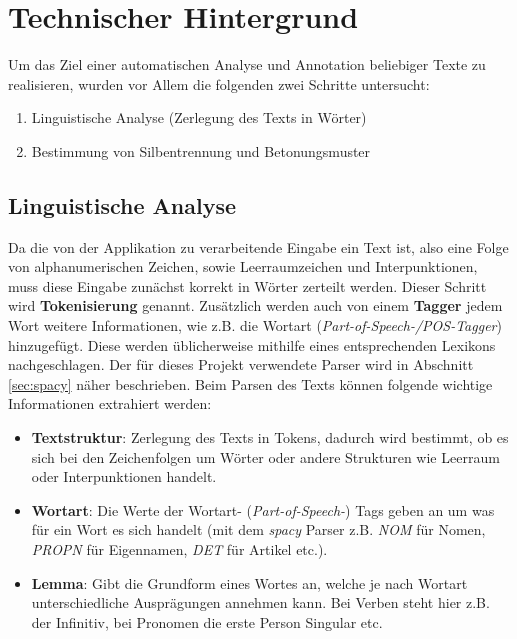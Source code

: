 \section{Technischer Hintergrund}

Um das Ziel einer automatischen Analyse und Annotation beliebiger Texte zu realisieren, wurden vor Allem die folgenden zwei Schritte untersucht:
\begin{enumerate}
	\item Linguistische Analyse (Zerlegung des Texts in Wörter)
	\item Bestimmung von Silbentrennung und Betonungsmuster
\end{enumerate}

\subsection{Linguistische Analyse}
Da die von der Applikation zu verarbeitende Eingabe ein Text ist, also eine Folge von alphanumerischen Zeichen, sowie Leerraumzeichen und Interpunktionen, muss diese Eingabe zunächst korrekt in Wörter zerteilt werden. Dieser Schritt wird \textbf{Tokenisierung} genannt. Zusätzlich werden auch von einem \textbf{Tagger} jedem Wort weitere Informationen, wie z.B. die Wortart (\textit{Part-of-Speech-/POS-Tagger}) hinzugefügt. Diese werden üblicherweise mithilfe eines entsprechenden Lexikons nachgeschlagen\cite{Carstensen2004}. Der für dieses Projekt verwendete Parser wird in Abschnitt \ref{sec:spacy} näher beschrieben. Beim Parsen des Texts können folgende wichtige Informationen extrahiert werden:

\begin{itemize}
	\item \textbf{Textstruktur}: Zerlegung des Texts in Tokens, dadurch wird bestimmt, ob es sich bei den Zeichenfolgen um Wörter oder andere Strukturen wie Leerraum oder Interpunktionen handelt.
	
	\item \textbf{Wortart}: Die Werte der Wortart- (\textit{Part-of-Speech-}) Tags geben an um was für ein Wort es sich handelt (mit dem \textit{spacy} Parser z.B. \textit{NOM} für Nomen, \textit{PROPN} für Eigennamen, \textit{DET} für Artikel etc.).
	\item  \textbf{Lemma}: Gibt die Grundform eines Wortes an, welche je nach Wortart unterschiedliche Ausprägungen annehmen kann. Bei Verben steht hier z.B. der Infinitiv, bei Pronomen die erste Person Singular etc.
\end{itemize}

